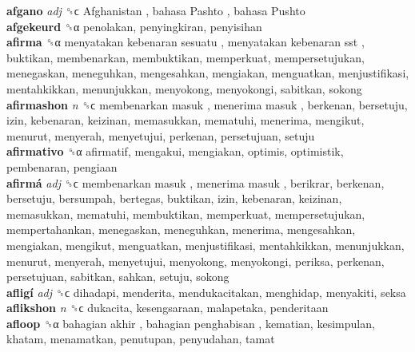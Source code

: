 \textbf{afgano} \emph{adj}  ␝ϲ   Afghanistan ,  bahasa Pashto ,  bahasa Pushto   \\
\textbf{afgekeurd} ␝α  penolakan, penyingkiran, penyisihan  \\
\textbf{afirma} ␝α   menyatakan kebenaran sesuatu ,  menyatakan kebenaran sst , buktikan, membenarkan, membuktikan, memperkuat, mempersetujukan, menegaskan, meneguhkan, mengesahkan, mengiakan, menguatkan, menjustifikasi, mentahkikkan, menunjukkan, menyokong, menyokongi, sabitkan, sokong  \\
\textbf{afirmashon} \emph{n}  ␝ϲ   membenarkan masuk ,  menerima masuk , berkenan, bersetuju, izin, kebenaran, keizinan, memasukkan, mematuhi, menerima, mengikut, menurut, menyerah, menyetujui, perkenan, persetujuan, setuju  \\
\textbf{afirmativo} ␝α  afirmatif, mengakui, mengiakan, optimis, optimistik, pembenaran, pengiaan  \\
\textbf{afirmá} \emph{adj}  ␝ϲ   membenarkan masuk ,  menerima masuk , berikrar, berkenan, bersetuju, bersumpah, bertegas, buktikan, izin, kebenaran, keizinan, memasukkan, mematuhi, membuktikan, memperkuat, mempersetujukan, mempertahankan, menegaskan, meneguhkan, menerima, mengesahkan, mengiakan, mengikut, menguatkan, menjustifikasi, mentahkikkan, menunjukkan, menurut, menyerah, menyetujui, menyokong, menyokongi, periksa, perkenan, persetujuan, sabitkan, sahkan, setuju, sokong  \\
\textbf{afligí} \emph{adj}  ␝ϲ  dihadapi, menderita, mendukacitakan, menghidap, menyakiti, seksa  \\
\textbf{aflikshon} \emph{n}  ␝ϲ  dukacita, kesengsaraan, malapetaka, penderitaan  \\
\textbf{afloop} ␝α   bahagian akhir ,  bahagian penghabisan , kematian, kesimpulan, khatam, menamatkan, penutupan, penyudahan, tamat  \\
